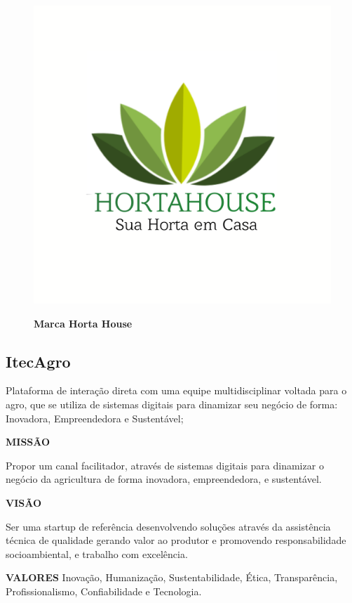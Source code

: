 \begin{figure}[!htb]
\centering
\caption{\textbf{Marca Horta House}}
\includegraphics[scale=0.1]{Imagens/hortahouse.png}
\label{figura_21}
\end{figure}
\newpage


\subsection{ItecAgro}

Plataforma de interação direta com uma equipe multidisciplinar voltada
para o agro, que se utiliza de sistemas digitais para dinamizar seu
negócio de forma: Inovadora, Empreendedora e Sustentável;

\textbf{MISSÃO}

Propor um canal facilitador, através de sistemas digitais para dinamizar o negócio da agricultura de forma inovadora, empreendedora, e sustentável.

\textbf{VISÃO}

Ser uma startup de referência desenvolvendo soluções através da assistência técnica de qualidade gerando valor ao produtor e promovendo responsabilidade socioambiental, e trabalho com excelência.

\textbf{VALORES}
Inovação, Humanização, Sustentabilidade, Ética, Transparência, Profissionalismo, Confiabilidade e Tecnologia.


